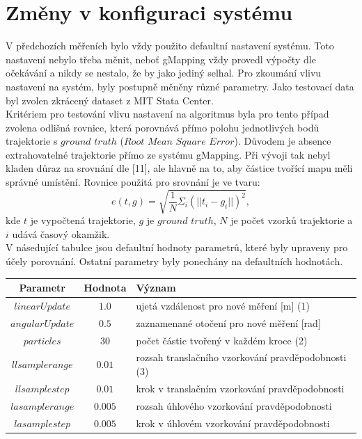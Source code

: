 \documentclass[12pt]{report}
\begin{document}
\section{Změny v konfiguraci systému}
V předchozích měřeních bylo vždy použito defaultní nastavení systému. Toto nastavení nebylo třeba měnit, neboť gMapping vždy provedl výpočty dle očekávání a nikdy se nestalo, že by jako jediný selhal. Pro zkoumání vlivu nastavení na systém, byly postupně měněny různé parametry. Jako testovací data byl zvolen zkrácený dataset z MIT Stata Center.\\
\indent Kritériem pro testování vlivu nastavení na algoritmus byla pro tento případ zvolena odlišná rovnice, která porovnává přímo polohu jednotlivých bodů trajektorie s $ground$ $truth$ ($Root$ $Mean$ $Square$ $Error$). Důvodem je absence extrahovatelné trajektorie přímo ze systému gMapping. Při vývoji tak nebyl kladen důraz na srovnání dle [11], ale hlavně na to, aby částice tvořící mapu měli správné umístění. Rovnice použitá pro srovnání je ve tvaru:
\begin{equation}
	e(t,g)=\sqrt{\frac{1}{N}\Sigma_i(||t_i-g_i||)^2},
\end{equation}
kde $t$ je vypočtená trajektorie, $g$ je $ground$ $truth$, $N$ je počet vzorků trajektorie a $i$ udává časový okamžik.\\
\indent V násedující tabulce jsou defaultní hodnoty parametrů, které byly upraveny pro účely porovnání. Ostatní parametry byly ponechány na defaultních hodnotách. 
\begin{center}
	\begin{tabular}{c|c|p{9.5cm}}
		\bfseries Parametr  & \bfseries Hodnota & \bfseries Význam \\ [2mm]
		\hline
		$linearUpdate$ & $1.0$ & ujetá vzdálenost pro nové měření [m]  (1)\\
		$angularUpdate$ & $0.5$ & zaznamenané otočení pro nové měření [rad]\\
		\hline
		$particles$ & $30$ & počet částic tvořený v každém kroce  (2)\\
		\hline
		$llsamplerange$ & $0.01$ & rozsah translačního vzorkování pravděpodobnosti (3)\\
		$llsamplestep$ & $0.01$ & krok v translačním vzorkování pravděpodobnosti\\
		$lasamplerange$ & $0.005$ & rozsah úhlového vzorkování pravděpodobnosti\\
		$lasamplestep$ & $0.005$ & krok v úhlovém vzorkování pravděpodobnosti\\
	\end{tabular}
\end{center}
\end{document}
